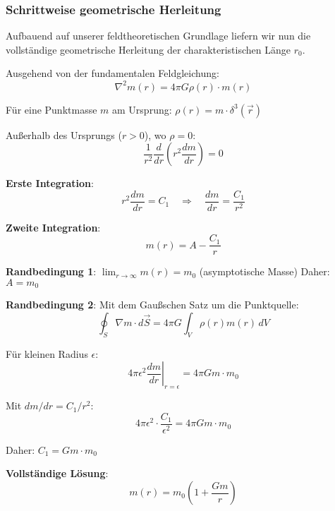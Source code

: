 \documentclass[12pt,a4paper]{article}
\begin{document}
\subsubsection{Schrittweise geometrische Herleitung}
\label{subsubsec:step_by_step_derivation}

Aufbauend auf unserer feldtheoretischen Grundlage liefern wir nun die vollständige geometrische Herleitung der charakteristischen Länge $r_0$.

Ausgehend von der fundamentalen Feldgleichung:
\begin{equation}
	\nabla^2 m(r) = 4\pi G \rho(r) \cdot m(r)
\end{equation}

Für eine Punktmasse $m$ am Ursprung: $\rho(r) = m \cdot \delta^3(\vec{r})$

Außerhalb des Ursprungs ($r > 0$), wo $\rho = 0$:
\begin{equation}
	\frac{1}{r^2}\frac{d}{dr}\left(r^2 \frac{dm}{dr}\right) = 0
\end{equation}

\textbf{Erste Integration}:
\begin{equation}
	r^2 \frac{dm}{dr} = C_1 \quad \Rightarrow \quad \frac{dm}{dr} = \frac{C_1}{r^2}
\end{equation}

\textbf{Zweite Integration}:
\begin{equation}
	m(r) = A - \frac{C_1}{r}
\end{equation}

\textbf{Randbedingung 1}: $\lim_{r \to \infty} m(r) = m_0$ (asymptotische Masse)
Daher: $A = m_0$

\textbf{Randbedingung 2}: Mit dem Gaußschen Satz um die Punktquelle:
\begin{equation}
	\oint_S \nabla m \cdot d\vec{S} = 4\pi G \int_V \rho(r) m(r) \, dV
\end{equation}

Für kleinen Radius $\epsilon$:
\begin{equation}
	4\pi \epsilon^2 \left.\frac{dm}{dr}\right|_{r=\epsilon} = 4\pi G m \cdot m_0
\end{equation}

Mit $dm/dr = C_1/r^2$:
\begin{equation}
	4\pi \epsilon^2 \cdot \frac{C_1}{\epsilon^2} = 4\pi G m \cdot m_0
\end{equation}

Daher: $C_1 = G m \cdot m_0$

\textbf{Vollständige Lösung}:
\begin{equation}
	m(r) = m_0\left(1 + \frac{Gm}{r}\right)
\end{equation}
\end{document}
